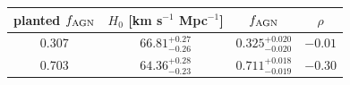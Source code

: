 \begin{tabular}{cccc}
\hline
planted $f_{\rm AGN}$ & $H_0$ [km s$^{-1}$ Mpc$^{-1}$] & $f_{\rm AGN}$ & $\rho$ \\
\hline
0.307 & $66.81^{+0.27}_{-0.26}$ & $0.325^{+0.020}_{-0.020}$ & $-0.01$ \\
0.703 & $64.36^{+0.28}_{-0.23}$ & $0.711^{+0.018}_{-0.019}$ & $-0.30$ \\
\hline
\end{tabular}
